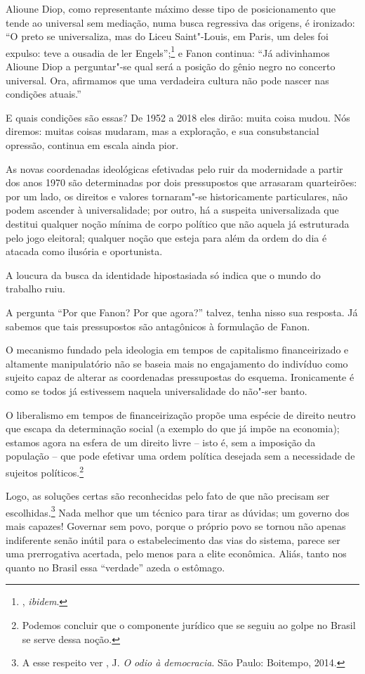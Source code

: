 Alioune Diop, como representante
máximo desse tipo de posicionamento que tende ao universal sem mediação,
numa busca regressiva das origens, é ironizado: ``O preto se
universaliza, mas do Liceu Saint"-Louis, em Paris, um deles foi expulso:
teve a ousadia de ler Engels'';\footnote{, \emph{ibidem}.} e Fanon
continua: ``Já adivinhamos Alioune Diop a perguntar"-se qual será a
posição do gênio negro no concerto universal. Ora, afirmamos que uma
verdadeira cultura não pode nascer nas condições atuais.''

E quais condições são essas? De 1952 a 2018 eles dirão: muita coisa
mudou. Nós diremos: muitas coisas mudaram, mas a exploração, e sua
consubstancial opressão, continua em escala ainda pior.

As novas coordenadas ideológicas efetivadas pelo ruir da modernidade a
partir dos anos 1970 são determinadas por dois pressupostos que
arrasaram quarteirões: por um lado, os direitos e valores tornaram"-se
historicamente particulares, não podem ascender à universalidade; por
outro, há a suspeita universalizada que destitui qualquer noção mínima
de corpo político que não aquela já estruturada pelo jogo eleitoral;
qualquer noção que esteja para além da ordem do dia é atacada como
ilusória e oportunista.

A loucura da busca da identidade hipostasiada só indica que o mundo do
trabalho ruiu.

A pergunta ``Por que Fanon? Por
que agora?'' talvez, tenha nisso sua resposta. Já sabemos que tais
pressupostos são antagônicos à formulação de Fanon.

O mecanismo fundado pela ideologia em tempos de capitalismo
financeirizado e altamente manipulatório não se baseia mais no
engajamento do indivíduo como sujeito capaz de alterar as coordenadas
pressupostas do esquema. Ironicamente é como se todos já estivessem
naquela universalidade do não"-ser banto.

O liberalismo em tempos de financeirização propõe uma espécie de direito
neutro que escapa da determinação social (a exemplo do que já impõe na
economia); estamos agora na esfera de um direito livre -- isto é, sem a
imposição da população -- que pode efetivar uma ordem política desejada
sem a necessidade de sujeitos políticos.\footnote{Podemos concluir que o
  componente jurídico que se seguiu ao golpe no Brasil se serve dessa
  noção.}

Logo, as soluções certas são reconhecidas pelo fato de que não precisam
ser escolhidas.\footnote{A esse respeito ver , J. \emph{O odio à
  democracia}. São Paulo: Boitempo, 2014.} Nada melhor que um técnico
para tirar as dúvidas; um governo dos mais capazes! Governar sem povo,
porque o próprio povo se tornou não apenas indiferente senão inútil para
o estabelecimento das vias do sistema, parece ser uma prerrogativa
acertada, pelo menos para a elite econômica. Aliás, tanto nos  quanto
no Brasil essa ``verdade'' azeda o estômago.

